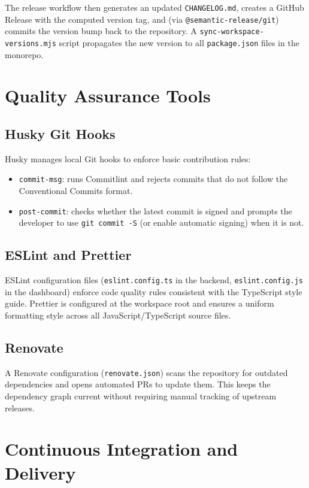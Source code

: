 \documentclass[12pt]{report}
\begin{document}
The release workflow then generates an updated \texttt{CHANGELOG.md}, creates
a GitHub Release with the computed version tag, and (via
\texttt{@semantic-release/git}) commits the version bump back to the repository.
A \texttt{sync-workspace-versions.mjs} script propagates the new version to
all \texttt{package.json} files in the monorepo.

\section{Quality Assurance Tools}

\subsection{Husky Git Hooks}

Husky manages local Git hooks to enforce basic contribution rules:

\begin{itemize}
  \item \texttt{commit-msg}: runs Commitlint and rejects commits that do not
    follow the Conventional Commits format.
  \item \texttt{post-commit}: checks whether the latest commit is signed and
    prompts the developer to use \texttt{git commit -S} (or enable automatic
    signing) when it is not.
\end{itemize}

\subsection{ESLint and Prettier}

ESLint configuration files (\texttt{eslint.config.ts} in the backend,
\texttt{eslint.config.js} in the dashboard) enforce code quality rules
consistent with the TypeScript style guide. Prettier is configured at the
workspace root and ensures a uniform formatting style across all
JavaScript/TypeScript source files.

\subsection{Renovate}

A Renovate configuration (\texttt{renovate.json}) scans the repository for
outdated dependencies and opens automated PRs to update them. This keeps the
dependency graph current without requiring manual tracking of upstream releases.

\section{Continuous Integration and Delivery}
\end{document}
